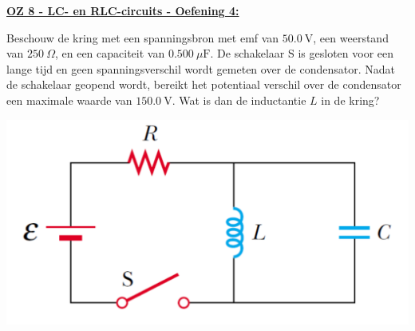 \textbf{\underline{OZ 8 - LC- en  RLC-circuits - Oefening 4:}}
\vspace{0.5cm}

Beschouw de kring met een spanningsbron met emf van $50.0 \ \text{V}$, een weerstand van $250 \ \Omega$, en een capaciteit van $0.500 \ \mu \text{F}$. De schakelaar S is gesloten voor een lange tijd en geen spanningsverschil wordt gemeten over de condensator. Nadat de schakelaar geopend wordt, bereikt het potentiaal verschil over de condensator een maximale waarde van $150.0 \ \text{V}$. Wat is dan de inductantie $L$ in de kring?

\begin{center}
    \includegraphics[scale = 0.3]{oz08/resources/Oz8Oef4.png}
\end{center}
    
\begin{description}[labelwidth=1.5cm, leftmargin=!]
    \item[Geg. :]   
    \item[Gevr. :] 
    \item[Opl. :]   
\end{description}

\vspace{1cm}